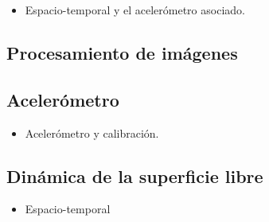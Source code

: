 \documentclass[../main.tex]{subfiles}
\begin{document}
\begin{itemize}
	\item Espacio-temporal y el acelerómetro asociado.
\end{itemize}

\subsection{Procesamiento de imágenes}

\subsection{Acelerómetro}
\begin{itemize}
	\item Acelerómetro y calibración.
\end{itemize}

\subsection{Dinámica de la superficie libre}
\begin{itemize}
	\item Espacio-temporal
\end{itemize}
\end{document}
